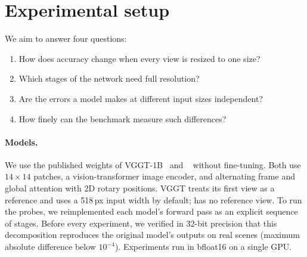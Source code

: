 \section{Experimental setup}
\label{sec:setup}

We aim to answer four questions:
\begin{enumerate}[nosep,leftmargin=*]
  \item How does accuracy change when every view is resized to one size?
  \item Which stages of the network need full resolution?
  \item Are the errors a model makes at different input sizes independent?
  \item How finely can the benchmark measure such differences?
\end{enumerate}

\paragraph{Models.}
We use the published weights of VGGT-1B~\cite{wang2025vggt} and \pithree~\cite{wang2025pi3} without fine-tuning. Both use $14{\times}14$ patches, a vision-transformer image encoder, and alternating frame and global attention with 2D rotary positions. VGGT treats its first view as a reference and uses a 518\,px input width by default; \pithree has no reference view. To run the probes, we reimplemented each model's forward pass as an explicit sequence of stages. Before every experiment, we verified in 32-bit precision that this decomposition reproduces the original model's outputs on real scenes (maximum absolute difference below $10^{-4}$). Experiments run in bfloat16 on a single GPU.

